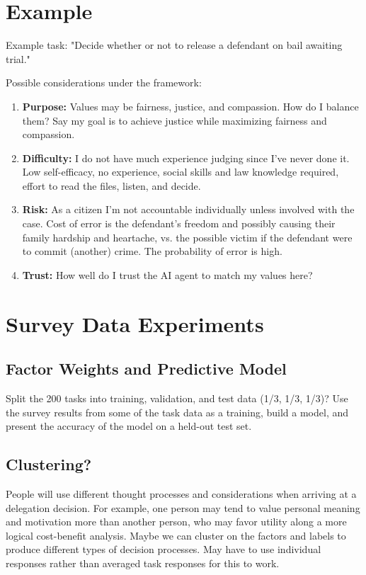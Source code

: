 \documentclass[letterpaper]{article} %
\begin{document}
\section{Example}
Example task: "Decide whether or not to release a defendant on bail awaiting trial."

Possible considerations under the framework:
\begin{enumerate}
    \item \textbf{Purpose:} Values may be fairness, justice, and compassion. How do I balance them? Say my goal is to achieve justice while maximizing fairness and compassion. 
    \item \textbf{Difficulty:} I do not have much experience judging since I've never done it. Low self-efficacy, no experience, social skills and law knowledge required, effort to read the files, listen, and decide. 
    \item \textbf{Risk:} As a citizen I'm not accountable individually unless involved with the case. Cost of error is the defendant's freedom and possibly causing their family hardship and heartache, vs. the possible victim if the defendant were to commit (another) crime. The probability of error is high.
    \item \textbf{Trust:} How well do I trust the AI agent to match my values here? 
\end{enumerate}

\section{Survey Data Experiments}

\subsection{Factor Weights and Predictive Model}
Split the 200 tasks into training, validation, and test data (1/3, 1/3, 1/3)? Use the survey results from some of the task data as a training, build a model, and present the accuracy of the model on a held-out test set.

\subsection{Clustering?}
People will use different thought processes and considerations when arriving at a delegation decision. For example, one person may tend to value personal meaning and motivation more than another person, who may favor utility along a more logical cost-benefit analysis. Maybe we can cluster on the factors and labels to produce different types of decision processes. May have to use individual responses rather than averaged task responses for this to work. 



\end{document}
